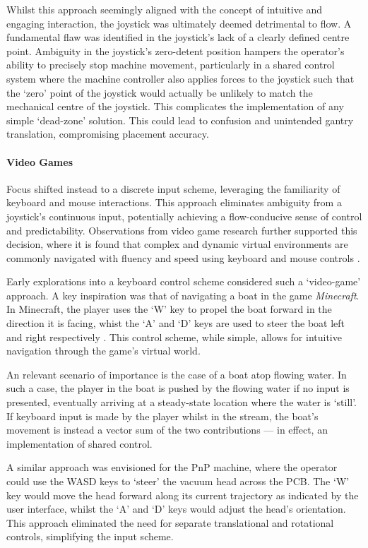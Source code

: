 \documentclass[12pt,british,UKenglish]{article}
\begin{document}
Whilst this approach seemingly aligned with the concept of intuitive and engaging interaction, the joystick was ultimately deemed detrimental to flow.
A fundamental flaw was identified in the joystick's lack of a clearly defined centre point.
Ambiguity in the joystick's zero-detent position hampers the operator's ability to precisely stop machine movement, particularly in a shared control system where the machine controller also applies forces to the joystick such that the `zero' point of the joystick would actually be unlikely to match the mechanical centre of the joystick.
This complicates the implementation of any simple `dead-zone' \cite{machinationsGlossary} solution.
This could lead to confusion and unintended gantry translation, compromising placement accuracy.

\paragraph{Video Games}
Focus shifted instead to a discrete input scheme, leveraging the familiarity of keyboard and mouse interactions.
This approach eliminates ambiguity from a joystick's continuous input, potentially achieving a flow-conducive sense of control and predictability.
Observations from video game research further supported this decision, where it is found that complex and dynamic virtual environments are commonly navigated with fluency and speed using keyboard and mouse controls \cite{6000321}.

Early explorations into a keyboard control scheme considered such a `video-game' approach.
A key inspiration was that of navigating a boat in the game \emph{Minecraft}.
In Minecraft, the player uses the `W' key to propel the boat forward in the direction it is facing, whist the `A' and `D' keys are used to steer the boat left and right respectively \cite{fandomBoat}.
This control scheme, while simple, allows for intuitive navigation through the game's virtual world.

An relevant scenario of importance is the case of a boat atop flowing water.
In such a case, the player in the boat is pushed by the flowing water if no input is presented, eventually arriving at a steady-state location where the water is `still'.
If keyboard input is made by the player whilst in the stream, the boat's movement is instead a vector sum of the two contributions --- in effect, an implementation of shared control.

A similar approach was envisioned for the \ac{PnP} machine, where the operator could use the WASD keys to `steer' the vacuum head across the \ac{PCB}.
The `W' key would move the head forward along its current trajectory as indicated by the user interface, whilst the `A' and `D' keys would adjust the head's orientation.
This approach eliminated the need for separate translational and rotational controls, simplifying the input scheme.
\end{document}
